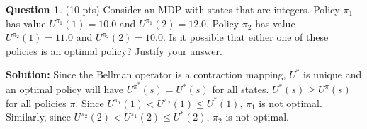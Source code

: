 \documentclass{article}
\theoremstyle{definition}
\newtheorem{question}[thm]{Question}
\begin{document}
\vspace{10cm}

\begin{question} (10 pts)
Consider an MDP with states that are integers. Policy $\pi_1$ has value $U^{\pi_1}(1) = 10.0$ and $U^{\pi_1}(2) = 12.0$. Policy $\pi_2$ has value $U^{\pi_2}(1) = 11.0$ and $U^{\pi_2}(2) = 10.0$. Is it possible that either one of these policies is an optimal policy? Justify your answer.
\end{question}
\noindent \textbf{Solution: }
Since the Bellman operator is a contraction mapping, $U^*$ is unique and an optimal policy will have $U^{\pi^*}(s) = U^*(s)$ for all states. $U^*(s) \geq U^\pi(s)$ for all policies $\pi$. Since $U^{\pi_1}(1) < U^{\pi_2}(1) \leq U^*(1)$, $\pi_1$ is not optimal. Similarly, since $U^{\pi_2}(2) < U^{\pi_1}(2) \leq U^*(2)$, $\pi_2$ is not optimal.
\end{document}
